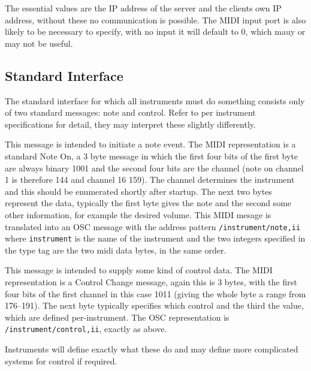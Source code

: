 \documentclass{article}
\begin{document}
The essential values are the IP address of the server and the clients own IP address, without these no communication is possible. The MIDI input port is
also likely to be necessary to specify, with no input it will default to 0, which mauy or may not be useful.

\subsection{Standard Interface}
The standard interface for which all instruments must do something consists only of two standard messages: note and control.
Refer to per instrument specifications for detail, they may interpret these slightly differently.
\begin{description} [style=multiline, labelwidth=\widthof{\bfseries Control}]
	\item [Note] This message is intended to initiate a note event. The MIDI representation is a standard Note On, a 3 byte message in which the first
			   four bits of the first byte are always binary 1001 and the second four bits are the channel (note on channel 1 is therefore 144 and
			    channel 16 159). The channel determines the instrument
			   and this should be enumerated shortly after startup. The next two bytes represent the data, typically the first byte gives the
			   note and the second some other information, for example the desired volume. This MIDI mesage is translated into an OSC message
			   with the address pattern \texttt{/instrument/note,ii} where \texttt{instrument} is the name of the instrument and the two integers 
			   specified in the type tag are the two midi data bytes, in the same order.
	\item [\hbox{Control}] This message is intended to supply some kind of control data. The MIDI representation is a Control Change message, again 
			       this is 3 bytes, with the first four bits of the first channel in this case 1011 (giving the whole byte a range from 176--191). The 
			       next byte typically specifies which control and the third the value, which are defined per-instrument.
			       The OSC representation is \texttt{/instrument/control,ii}, exactly as above.
			 
\end{description}

Instruments will define exactly what these do and may define more complicated systems for control if required.
\end{document}
